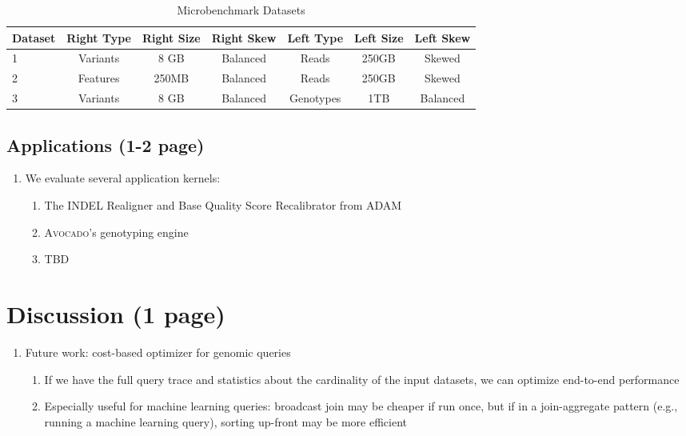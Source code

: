 \documentclass{vldb}
\begin{document}
\begin{table*}[t]
\centering
\caption{Microbenchmark Datasets}
\label{tab:microbenchmarks}
\begin{tabular}{ l | c c c | c c c }
\hline
Dataset & Right Type & Right Size & Right Skew & Left Type & Left Size & Left Skew \\
\hline
\hline
1 & Variants & 8 GB & Balanced & Reads & 250GB & Skewed \\
2 & Features & 250MB & Balanced & Reads & 250GB & Skewed \\
3 & Variants & 8 GB & Balanced & Genotypes & 1TB & Balanced \\
\hline
\end{tabular}
\end{table*}

\subsection{Applications (1-2 page)}
\label{sec:applications}

\begin{enumerate}
\item We evaluate several application kernels:
\begin{enumerate}
\item The INDEL Realigner and Base Quality Score Recalibrator from
\textsc{ADAM}~\cite{massie13, nothaft15}
\item \textsc{Avocado}'s genotyping engine~\cite{nothaft15avocado, nothaft17}
\item TBD
\end{enumerate}
\end{enumerate}

\section{Discussion  (1 page)}
\label{sec:discussion}

\begin{enumerate}
\item Future work: cost-based optimizer for genomic queries
\begin{enumerate}
\item If we have the full query trace and statistics about the cardinality of
the input datasets, we can optimize end-to-end performance
\item Especially useful for machine learning queries: broadcast join may be
cheaper if run once, but if in a join-aggregate pattern (e.g., running a
machine learning query), sorting up-front may be more efficient
\end{enumerate}
\end{enumerate}
\end{document}
